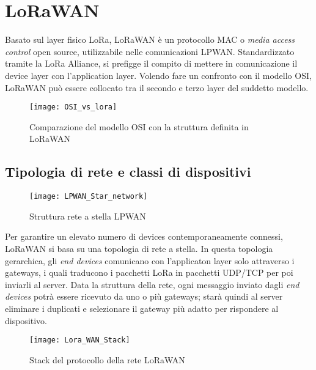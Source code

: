 \section{LoRaWAN}

Basato sul layer fisico LoRa, LoRaWAN è un protocollo
MAC o \emph{media access control} open source, utilizzabile nelle comunicazioni
LPWAN. 
Standardizzato tramite la LoRa Alliance, si prefigge il compito di mettere in
comunicazione il device layer con l'application layer.
Volendo fare un confronto con il modello OSI, LoRaWAN può essere collocato tra il
secondo e terzo layer del suddetto modello. 

\begin{figure}[ht]
\centering 
\texttt{[image: OSI\_vs\_lora]}
\caption{Comparazione del modello OSI con la struttura definita in LoRaWAN}
\label{}
\end{figure}

\subsection{Tipologia di rete e classi di dispositivi}
\begin{figure}[ht]
\centering 
\texttt{[image: LPWAN\_Star\_network]}
\caption{Struttura rete a stella LPWAN}
\end{figure}
Per garantire un elevato numero di devices contemporaneamente connessi, LoRaWAN
si basa su una topologia di rete a stella.
In questa topologia gerarchica, gli \emph{end devices} comunicano con
l'applicaton layer solo attraverso i gateways, i quali traducono i pacchetti LoRa in pacchetti
UDP/TCP per poi inviarli al server.
Data la struttura della rete,  ogni messaggio inviato dagli \emph{end devices} potrà essere ricevuto da uno o più
gateways; starà quindi al server eliminare i duplicati e selezionare il gateway
più adatto per rispondere al dispositivo.

\begin{figure}[ht]
\centering 
\texttt{[image: Lora\_WAN\_Stack]}
\caption{Stack del protocollo della rete LoRaWAN}
\label{fig:stack_lora}
\end{figure}

